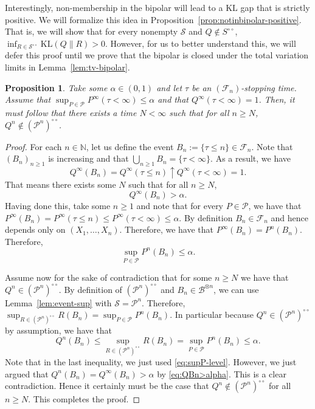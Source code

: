 \documentclass[11pt]{article}
\newcommand{\KL}{\mathrm{KL}}
\newcommand{\Pcal}{\mathcal{P}}
\newcommand{\B}{\mathcal{B}}
\newcommand{\bPn}{(\mathcal{P}^n)^{\circ\circ}}
\newtheorem{proposition}[theorem]{Proposition}
\theoremstyle{definition}
\theoremstyle{definition}
\begin{document}
Interestingly, non-membership in the bipolar will lead to a $\KL$ gap that is strictly positive. We will formalize this idea in Proposition~\ref{prop:notinbipolar-positive}. That is, we will show that for every nonempty $\mathcal S$ and $Q\notin S^{\circ\circ}$, $\inf_{R\in\mathcal S^{\circ\circ}}\KL(Q\|R)>0$. However, for us to better understand this, we will defer this proof until we prove that the bipolar is closed under the total variation limits in Lemma~\ref{lem:tv-bipolar}.   

\begin{proposition}\label{prop:powerone-implies-out}
Take some $\alpha\in(0,1)$ and let $\tau$ be an $(\mathcal F_n)$-stopping time. Assume that $\sup_{P\in\Pcal}P^\infty(\tau<\infty)\le \alpha$ and that $Q^\infty(\tau<\infty)=1$. Then, it must follow that there exists a time $N<\infty$ such that for all $n\ge N$, $Q^n\notin\bPn$. 
\end{proposition}

\begin{proof}
For each $n\in\mathbb N$, let us define the event $B_n:=\{\tau\le n\}\in\mathcal F_n$. Note that $(B_n)_{n\ge 1}$ is increasing and that $\bigcup_{n\ge 1}B_n=\{\tau<\infty\}$. As a result, we have
\begin{equation}\label{eq:Bn-to-1}
Q^\infty(B_n)=Q^\infty(\tau\le n)\uparrow Q^\infty(\tau<\infty)=1.    
\end{equation}
That means there exists some $N$ such that for all $n\ge N$,
\begin{equation}\label{eq:QBn>alpha}
Q^\infty(B_n)>\alpha.   
\end{equation}
Having done this, take some $n\ge 1$ and note that for every $P\in\Pcal$, we have that $P^\infty(B_n)=P^\infty(\tau\le n)\le P^\infty(\tau<\infty)\le \alpha$. By definition $B_n\in\mathcal F_n$ and hence depends only on $(X_1,\dots,X_n)$. Therefore, we have that $P^\infty(B_n)=P^n(B_n)$. Therefore,
\begin{equation}\label{eq:supP-level}
\sup_{P\in\Pcal}P^n(B_n)\le \alpha.    
\end{equation}

Assume now for the sake of contradiction that for some $n\ge N$ we have that $Q^n\in\bPn$. By definition of $\bPn$ and $B_n\in\B^{\otimes n}$, we can use Lemma~\ref{lem:event-sup} with $\mathcal S=\Pcal^n$. Therefore, $\sup_{R\in\bPn} R(B_n)=\sup_{P\in\Pcal} P^n(B_n)$. In particular because $Q^n\in\bPn$ by assumption, we have that
\[
Q^n(B_n)\le \sup_{R\in\bPn} R(B_n)=\sup_{P\in\Pcal} P^n(B_n)\le \alpha.
\]
Note that in the last inequality, we just used \eqref{eq:supP-level}. However, we just argued that $Q^n(B_n)=Q^\infty(B_n)>\alpha$ by \eqref{eq:QBn>alpha}. This is a clear contradiction. Hence it certainly must be the case that $Q^n\notin\bPn$ for all $n\ge N$. This completes the proof.
\end{proof}
\end{document}

